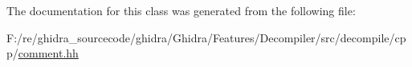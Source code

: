 The documentation for this class was generated from the following file\+:\begin{DoxyCompactItemize}
\item 
F\+:/re/ghidra\+\_\+sourcecode/ghidra/\+Ghidra/\+Features/\+Decompiler/src/decompile/cpp/\mbox{\hyperlink{comment_8hh}{comment.\+hh}}\end{DoxyCompactItemize}
